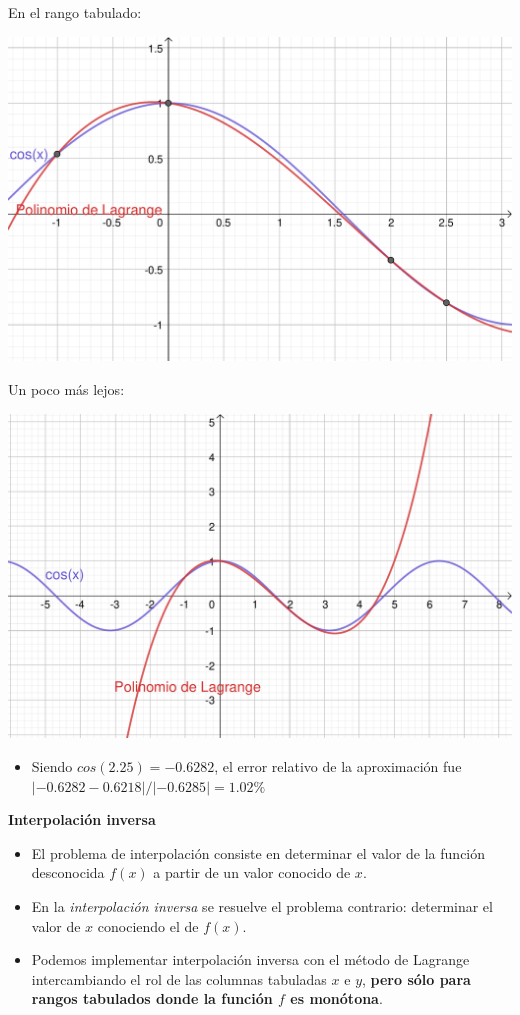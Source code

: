 \documentclass[]{book}
\providecommand{\tightlist}{%
  \setlength{\itemsep}{0pt}\setlength{\parskip}{0pt}}
\begin{document}
En el rango tabulado:

\begin{center}\includegraphics[width=1\linewidth]{Plots/U4/lagrange2} \end{center}

Un poco más lejos:

\begin{center}\includegraphics[width=1\linewidth]{Plots/U4/lagrange} \end{center}

\begin{itemize}
\tightlist
\item
  Siendo \(cos(2.25) = -0.6282\), el error relativo de la aproximación fue \(|-0.6282-0.6218| / |-0.6285| = 1.02\%\)
\end{itemize}

\textbf{Interpolación inversa}

\begin{itemize}
\tightlist
\item
  El problema de interpolación consiste en determinar el valor de la función desconocida \(f(x)\) a partir de un valor conocido de \(x\).
\item
  En la \emph{interpolación inversa} se resuelve el problema contrario: determinar el valor de \(x\) conociendo el de \(f(x)\).
\item
  Podemos implementar interpolación inversa con el método de Lagrange intercambiando el rol de las columnas tabuladas \(x\) e \(y\), \textbf{pero sólo para rangos tabulados donde la función \(f\) es monótona}.
\end{itemize}
\end{document}
